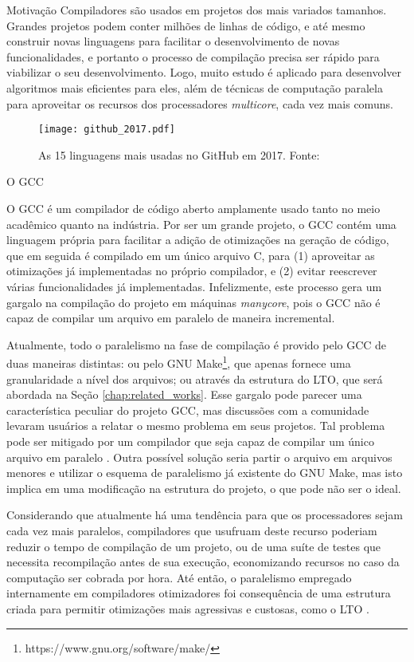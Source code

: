 \begin{section}{Motivação}
Compiladores são usados em projetos dos mais variados tamanhos.
Grandes projetos podem conter milhões de linhas de código, e até mesmo
construir novas linguagens para facilitar o desenvolvimento de novas
funcionalidades, e portanto o processo de compilação precisa ser rápido
para viabilizar o seu desenvolvimento. Logo, muito estudo é aplicado
para desenvolver algoritmos mais eficientes para eles, além de técnicas
de computação paralela para aproveitar os recursos dos processadores
\textit{multicore}, cada vez mais comuns.

\begin{figure}[ht]
 \centering
 \texttt{[image: github\_2017.pdf]}
 \caption{As 15 linguagens mais usadas no GitHub em 2017. Fonte: \cite{githuboctoverse}}
 \label{fig:github_2017}
\end{figure}

\end{section}

\begin{section}{O GCC}

O GCC é um compilador de código aberto amplamente usado tanto no meio
acadêmico quanto na indústria. Por ser um grande projeto, o GCC contém uma
linguagem própria para facilitar a adição de otimizações na geração de
código, que em seguida é compilado em um único arquivo C, para (1)
aproveitar as otimizações já implementadas no próprio compilador, e (2)
evitar reescrever várias funcionalidades já implementadas. Infelizmente, este processo
gera um gargalo na compilação do projeto em máquinas \textit{manycore}, pois o
GCC não é capaz de compilar um arquivo em paralelo de maneira incremental.

Atualmente, todo o paralelismo na fase de compilação é provido pelo GCC de
duas maneiras distintas: ou pelo GNU Make\footnote{https://www.gnu.org/software/make/},
que apenas fornece uma granularidade a nível dos arquivos; ou através da estrutura do
LTO, que será abordada na Seção \ref{chap:related_works}. Esse gargalo pode parecer uma
característica peculiar do projeto GCC, mas discussões com a comunidade levaram
usuários a relatar o mesmo problema em seus projetos. Tal problema pode ser
mitigado por um compilador que seja capaz de compilar um único arquivo em paralelo
\citep{mailgcc} \citep{phoronix}.  Outra possível solução seria
partir o arquivo em arquivos menores e utilizar o esquema de
paralelismo já existente do GNU Make, mas isto implica em uma modificação na
estrutura do projeto, o que pode não ser o ideal.

Considerando que atualmente há uma tendência para que os processadores sejam
cada vez mais paralelos, compiladores que usufruam deste recurso poderiam
reduzir o tempo de compilação de um projeto, ou de uma suíte de testes que
necessita recompilação antes de sua execução, economizando recursos no caso da
computação ser cobrada por hora. Até então, o paralelismo empregado internamente
em compiladores otimizadores foi consequência de uma estrutura criada para
permitir otimizações mais agressivas e custosas, como o LTO
\citep{glek2010optimizing}.

\end{section}


